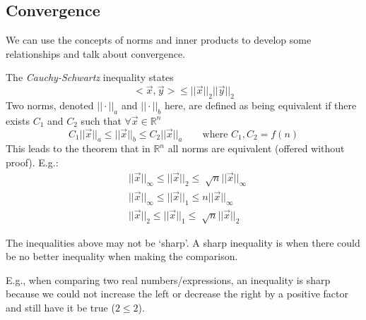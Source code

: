 \documentclass[12pt]{article}
\begin{document}
\subsection{Convergence}
We can use the concepts of norms and inner products to develop some relationships and talk about convergence. 

The \textit{Cauchy-Schwartz} inequality states
%
\begin{equation}
< \vec{x}, \vec{y} > \leq ||\vec{x}||_2 ||\vec{y}||_2 \nonumber
\end{equation}
%
Two norms, denoted $|| \cdot ||_a$ and $|| \cdot ||_b$ here, are defined as being equivalent if there exists $C_1$ and $C_2$ such that $\forall \vec{x} \in \mathbb{R}^n$
%
\begin{equation}
C_1 ||\vec{x}||_a \leq ||\vec{x}||_b \leq C_2 ||\vec{x}||_a \qquad \text{where } C_1, C_2 = f(n) \nonumber
\end{equation}
%
This leads to the theorem that in $\mathbb{R}^n$ all norms are equivalent (offered without proof). E.g.:
\begin{align}
& ||\vec{x}||_{\infty} \leq ||\vec{x}||_2 \leq \sqrt[]{n} ||\vec{x}||_{\infty} \nonumber \\
%
& ||\vec{x}||_{\infty} \leq ||\vec{x}||_1 \leq n ||\vec{x}||_{\infty} \nonumber \\
%
& ||\vec{x}||_2 \leq ||\vec{x}||_1 \leq \sqrt[]{n} ||\vec{x}||_2 \nonumber
\end{align}

The inequalities above may not be `sharp'. A sharp inequality is when there could be no better inequality when making the comparison. 

E.g., when comparing two real numbers/expressions, an inequality is sharp because we could not increase the left or decrease the right by a positive factor and still have it be true ($2 \leq 2$). 
\end{document}
